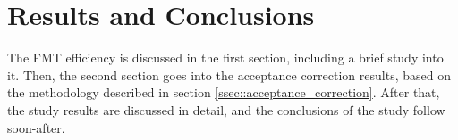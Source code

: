 \section{Results and Conclusions}
\label{sec::results_and_conclusions}
    The FMT efficiency is discussed in the first section, including a brief study into it.
    Then, the second section goes into the acceptance correction results, based on the methodology described in section \ref{ssec::acceptance_correction}.
    After that, the study results are discussed in detail, and the conclusions of the study follow soon-after.

    

%
